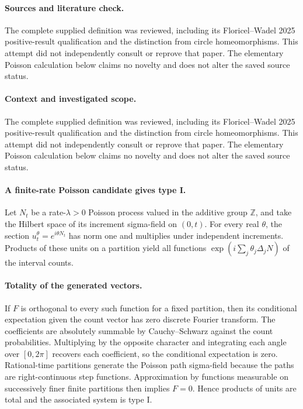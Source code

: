 \documentclass[11pt]{article}
\begin{document}
\paragraph{Sources and literature check.}
The complete supplied definition was reviewed, including its Floricel–Wadel 2025 positive-result qualification and the distinction from circle homeomorphisms. This attempt did not independently consult or reprove that paper. The elementary Poisson calculation below claims no novelty and does not alter the saved source status.

\paragraph{Context and investigated scope.} The complete supplied definition was reviewed, including its Floricel–Wadel 2025 positive-result qualification and the distinction from circle homeomorphisms. This attempt did not independently consult or reprove that paper. The elementary Poisson calculation below claims no novelty and does not alter the saved source status.

\paragraph{A finite-rate Poisson candidate gives type I.} Let $N_t$ be a rate-$\lambda>0$ Poisson process valued in the additive group $\mathbb Z$, and take the Hilbert space of its increment sigma-field on $(0,t)$. For every real $\theta$, the section $u_t^\theta=e^{i\theta N_t}$ has norm one and multiplies under independent increments. Products of these units on a partition yield all functions $\exp(i\sum_j\theta_j\Delta_jN)$ of the interval counts.

\paragraph{Totality of the generated vectors.} If $F$ is orthogonal to every such function for a fixed partition, then its conditional expectation given the count vector has zero discrete Fourier transform. The coefficients are absolutely summable by Cauchy--Schwarz against the count probabilities. Multiplying by the opposite character and integrating each angle over $[0,2\pi]$ recovers each coefficient, so the conditional expectation is zero. Rational-time partitions generate the Poisson path sigma-field because the paths are right-continuous step functions. Approximation by functions measurable on successively finer finite partitions then implies $F=0$. Hence products of units are total and the associated system is type I.
\end{document}
